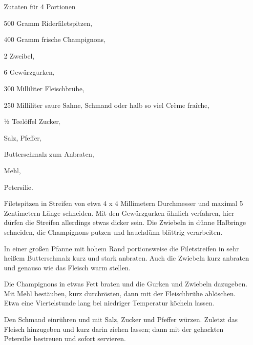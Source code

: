 \startsection[title={Bœuf Stroganoff},reference=boeuf-stroganoff]

\startitemize
\item Zutaten für 4 Portionen
      \startitemize
      \item 500 Gramm Riderfiletspitzen,
      \item 400 Gramm frische Champignons,
      \item 2 Zweibel,
      \item 6 Gewürzgurken,
      \item 300 Milliliter Fleischbrühe,
      \item 250 Milliliter saure Sahne, Schmand oder halb so viel
        Crème fraîche,
      \item ½ Teelöffel Zucker,
      \item Salz, Pfeffer,
      \item Butterschmalz zum Anbraten,
      \item Mehl,
      \item Petersilie.
      \stopitemize

\item Filetspitzen in Streifen von etwa 4 x 4 Millimetern Durchmesser
  und maximal 5 Zentimetern Länge schneiden. Mit den Gewürzgurken
  ähnlich verfahren, hier dürfen die Streifen allerdings etwas dicker
  sein. Die Zwiebeln in dünne Halbringe schneiden, die Champignons
  putzen und hauchdünn-blättrig verarbeiten.
\item In einer großen Pfanne mit hohem Rand portionsweise die
  Filetstreifen in sehr heißem Butterschmalz kurz und stark anbraten.
  Auch die Zwiebeln kurz anbraten und genauso wie das Fleisch warm
  stellen.
\item Die Champignons in etwas Fett braten und die Gurken und Zwiebeln
  dazugeben. Mit Mehl bestäuben, kurz durchrösten, dann mit der
  Fleischbrühe ablöschen. Etwa eine Viertelstunde lang bei niedriger
  Temperatur köcheln lassen.
\item Den Schmand einrühren und mit Salz, Zucker und Pfeffer würzen.
  Zuletzt das Fleisch hinzugeben und kurz darin ziehen lassen; dann mit
  der gehackten Petersilie bestreuen und sofort servieren.
\stopitemize

\stopsection

